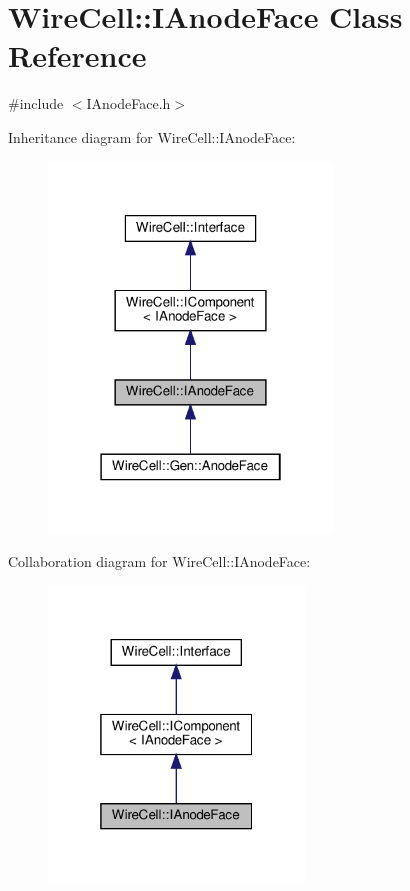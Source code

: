 \hypertarget{class_wire_cell_1_1_i_anode_face}{}\section{Wire\+Cell\+:\+:I\+Anode\+Face Class Reference}
\label{class_wire_cell_1_1_i_anode_face}


{\ttfamily \#include $<$I\+Anode\+Face.\+h$>$}



Inheritance diagram for Wire\+Cell\+:\+:I\+Anode\+Face\+:
\nopagebreak
\begin{figure}[H]
\begin{center}
\leavevmode
\includegraphics[width=214pt]{class_wire_cell_1_1_i_anode_face__inherit__graph}
\end{center}
\end{figure}


Collaboration diagram for Wire\+Cell\+:\+:I\+Anode\+Face\+:
\nopagebreak
\begin{figure}[H]
\begin{center}
\leavevmode
\includegraphics[width=193pt]{class_wire_cell_1_1_i_anode_face__coll__graph}
\end{center}
\end{figure}
